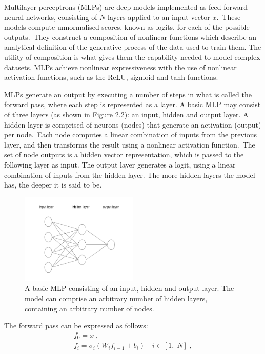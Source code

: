 \noindent Multilayer perceptrons (MLPs) are deep models implemented as feed-forward neural networks, consisting of $N$ layers applied to an input vector $ x $.\ These models compute unnormalised scores, known as logits, for each of the possible outputs.\ They construct a composition of nonlinear functions which describe an analytical definition of the generative process of the data used to train them. The utility of composition is what gives them the capability needed to model complex datasets. MLPs achieve nonlinear expressiveness with the use of nonlinear activation functions, such as the ReLU, sigmoid and tanh functions.  \par

\noindent MLPs generate an output by executing a number of steps in what is called the forward pass, where each step is represented as a layer. A basic MLP may consist of three layers (as shown in Figure 2.2): an input, hidden and output layer. A hidden layer is comprised of neurons (nodes) that generate an activation (output) per node.\ Each node computes a linear combination of inputs from the previous layer, and then transforms the result using a nonlinear activation function.\ The set of node outputs is a hidden vector representation, which is passed to the following layer as input. The output layer generates a logit, using a linear combination of inputs from the hidden layer. The more hidden layers the model has, the deeper it is said to be.

\begin{figure}
   	\centering
    	\includegraphics[width=0.5\textwidth, height=0.3\textwidth]{multilayer_perceptron}
	\captionsetup{justification=centering}
	\caption{A basic MLP consisting of an input, hidden and output layer. The model can comprise an arbitrary number of hidden layers, containing an arbitrary number of nodes.}
\end{figure}

\noindent The forward pass can be expressed as follows:
\begin{subequations}
	\begin{gather}
		f_0 = x \; , \\
		f_i=\sigma_i(W_{i}f_{i - 1} + b_{i}) \quad i \in [1, \; N] \; ,
	\end{gather}
\end{subequations}

